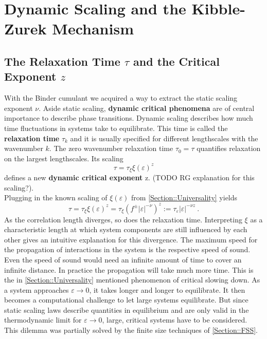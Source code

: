 	\section{Dynamic Scaling and the Kibble-Zurek Mechanism} \label{Section::Dynamic-Scaling}
	\subsection{The Relaxation Time $\tau$ and the Critical Exponent $z$}
	With the Binder cumulant we acquired a way to extract the static scaling exponent $\nu$. Aside static scaling, \textbf{dynamic critical phenomena} are of central importance to describe phase transitions. Dynamic scaling describes how much time fluctuations in systems take to equilibrate. This time is called the  \textbf{relaxation time} $\tau_k$ and it is usually specified for different lengthscales with the wavenumber $k$. The zero wavenumber relaxation time $\tau_0 =	\tau$ quantifies relaxation on the largest lengthscales. Its scaling \cite{hohenberg1977theory}
	\begin{equation}
		\tau =	\tau_\xi \xi(\varepsilon)^z
	\end{equation}
	defines a new \textbf{dynamic critical exponent} z. (TODO RG explanation for this scaling?). \\
	
	Plugging in the known scaling of $\xi(\varepsilon)$ from \autoref{Section::Universality} yields
	\begin{equation}
		\tau = \tau_\xi \xi(\varepsilon)^z =\tau_\xi	\left(f^{\pm} |\varepsilon|^{-\nu}\right)^z :=	\tau_\varepsilon |\varepsilon|^{-\nu z} ~.
	\end{equation}
	As the correlation length diverges, so does the relaxation time. Interpreting $\xi$ as a characteristic length at which system components are still influenced by each other gives an intuitive explanation for this divergence. The maximum speed for the propagation of interactions in the system is the respective speed of sound. Even the speed of sound would need an infinite amount of time to cover an infinite distance. In practice the propagation will take much more time. This is the in \autoref{Section::Universality} mentioned phenomenon of critical slowing down. As a system approaches $\varepsilon \rightarrow 0$, it takes longer and longer to equilibrate. It then becomes a computational challenge to let large systems equilibrate. But since static scaling laws describe quantities in equilibrium and are only valid in the thermodynamic limit for $\varepsilon \rightarrow 0$, large, critical systems have to be considered.  This dilemma was partially solved by the finite size techniques of \autoref{Section::FSS}. \\
	
